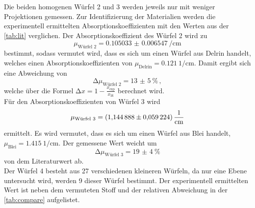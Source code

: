 \noindent Die beiden homogenen Würfel 2 und 3 werden jeweils nur mit weniger Projektionen gemessen. Zur Identifizierung der Materialien werden die 
experimentell ermittelten Absorptionskoeffizienten mit den Werten aus der \autoref{tab:lit} verglichen. Der Absorptionskoeffizient des Würfel 2 wird zu
\begin{equation*}
    \mu_{\text{Würfel 2}} = \SI{0.105033(6547)}{\per\centi\metre}
\end{equation*}
bestimmt, sodass vermutet wird, dass es sich um einen Würfel aus Delrin handelt, welches einen Absorptionskoeffizienten von $\mu_{\text{Delrin}} = 
\SI{0.121}{1\per\centi\metre}$. Damit ergibt sich eine Abweichung von 
\begin{equation*}
    \increment \mu_{\text{Würfel 2}} = \SI{13(5)}{\percent}\, ,
\end{equation*}
welche über die Formel $\increment x = 1 - \frac{x_{\text{exp}}}{x_{\text{lit}}}$ berechnet wird. \\
Für den Absorptionskoeffizienten von Würfel 3 wird 
\begin{equation*}
    \mu_{\text{Würfel 3}} = \SI{1.144888 (59224)}{\per\centi\metre}
\end{equation*}
ermittelt. Es wird vermutet, dass es sich um einen Würfel aus Blei handelt, $\mu_{\text{Blei}} = \SI{1.415}{1\per\centi\metre}$. Der gemessene Wert 
weicht um 
\begin{equation*}
    \increment \mu_{\text{Würfel 3}} = \SI{19(4)}{\percent}
\end{equation*}
von dem Literaturwert ab.\\
Der Würfel 4 besteht aus 27 verschiedenen kleineren Würfeln, da nur eine Ebene untersucht wird, werden 9 dieser Würfel bestimmt. Der experimentell ermittelten 
Wert ist neben dem vermuteten Stoff und der relativen Abweichung in der \autoref{tab:compare} aufgelistet. 

